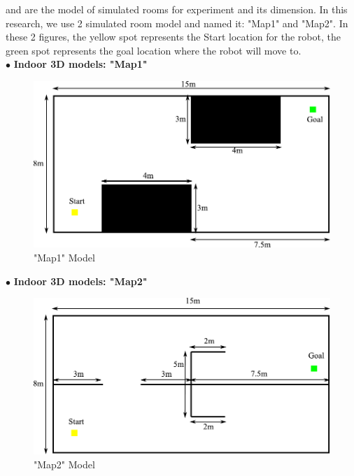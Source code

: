 \hspace{1.27cm}
\textbf{\figureautorefname{ \ref{fig:Map1}}} and \textbf{\figureautorefname{ \ref{fig:Map2}}} are the model of simulated rooms for experiment and its dimension. In this research, we use 2 simulated room model and named it: "Map1" and "Map2". In these 2 figures, the yellow spot represents the Start location for the robot, the green spot represents the goal location where the robot will move to.\\
$\bullet$ \textbf{Indoor 3D models: "Map1"}\par
\begin{figure}[H]
	\centering
	\includegraphics[scale=1]{images/imagess/3method-map1.pdf} 
	\caption{"Map1" Model}
	\label{fig:Map1}
\end{figure}

$\bullet$ \textbf{Indoor 3D models: "Map2"}\par
\begin{figure}[H]
	\centering
	\includegraphics[scale=1]{images/imagess/3method-map2.pdf} 
	\caption{"Map2" Model}
	\label{fig:Map2}
\end{figure}
